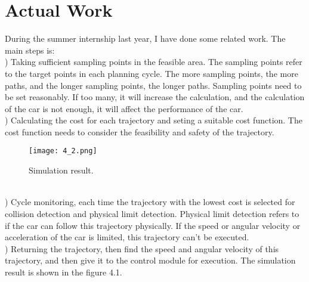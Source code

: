 \documentclass{thesisreport}
\begin{document}
 \chapter{Actual Work}
 During the summer internship last year, I have done some related work. The main steps is:\\
 ) Taking sufficient sampling points in the feasible area. The sampling points refer to the target points in each planning cycle. The more sampling points, the more paths, and the longer sampling points, the longer paths. Sampling points need to be set reasonably. If too many, it will increase the calculation, and the calculation of the car is not enough, it will affect the performance of the car.\\
 ) Calculating the cost for each trajectory and seting a suitable cost function. The cost function needs to consider the feasibility and safety of the trajectory.\\
 \indent
    \begin{figure}[ht]
 	\centering
 	\texttt{[image: 4\_2.png]}
 	\caption{Simulation result.}
 	\label{fig:4.1} 
 \end{figure}\\
) Cycle monitoring, each time the trajectory with the lowest cost is selected for collision detection and physical limit detection. Physical limit detection refers to if the car can follow this trajectory physically. If the speed or angular velocity or acceleration of the car is limited,  this trajectory can't be executed.\\
 ) Returning the trajectory, then find the speed and angular velocity of this trajectory, and then give it to the control module for execution. The simulation result is shown in the figure 4.1.
 
 
 
% 
% 
 
 
 
 
 
 
 
 
\end{document}
